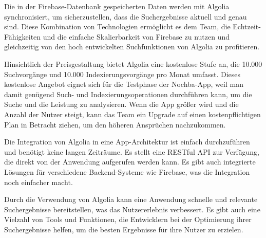 Die in der Firebase-Datenbank gespeicherten Daten werden mit Algolia synchronisiert, um sicherzustellen, dass die Suchergebnisse aktuell und genau sind. Diese Kombination von Technologien ermöglicht es dem Team, die Echtzeit-Fähigkeiten und die einfache Skalierbarkeit von Firebase zu nutzen und gleichzeitig von den hoch entwickelten Suchfunktionen von Algolia zu profitieren.

Hinsichtlich der Preisgestaltung bietet Algolia eine kostenlose Stufe an, die 10.000 Suchvorgänge und 10.000 Indexierungsvorgänge pro Monat umfasst. Dieses kostenlose Angebot eignet sich für die Testphase der Nochba-App, weil man damit genügend Such- und Indexierungsoperationen durchführen kann, um die Suche und die Leistung zu analysieren. Wenn die App größer wird und die Anzahl der Nutzer steigt, kann das Team ein Upgrade auf einen kostenpflichtigen Plan in Betracht ziehen, um den höheren Ansprüchen nachzukommen.

Die Integration von Algolia in eine App-Architektur ist einfach durchzuführen und benötigt keine langen Zeiträume. Es stellt eine RESTful API zur Verfügung, die direkt von der Anwendung aufgerufen werden kann. Es gibt auch integrierte Lösungen für verschiedene Backend-Systeme wie Firebase, was die Integration noch einfacher macht.

Durch die Verwendung von Algolia kann eine Anwendung schnelle und relevante Suchergebnisse bereitstellen, was das Nutzererlebnis verbessert. Es gibt auch eine Vielzahl von Tools und Funktionen, die Entwicklern bei der Optimierung ihrer Suchergebnisse helfen, um die besten Ergebnisse für ihre Nutzer zu erzielen.


